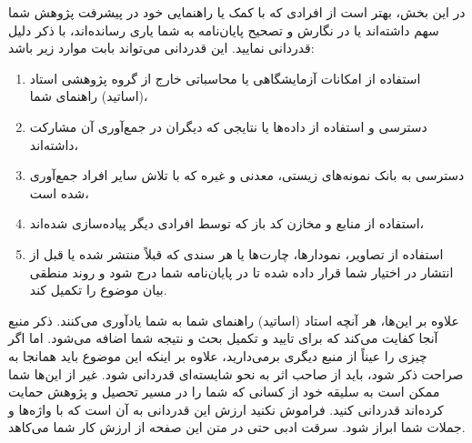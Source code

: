در این بخش، بهتر است از افرادی که با کمک یا راهنمایی خود در پیشرفت پژوهش شما سهم داشته‌اند یا در نگارش و تصحیح پایان‌نامه به شما یاری رسانده‌اند، با ذکر دلیل قدردانی نمایید. این قدردانی می‌تواند بابت موارد زیر باشد:
\begin{enumerate}
\item 
استفاده از امکانات آزمایشگاهی یا محاسباتی خارج از گروه‌ پژوهشی استاد (اساتید) راهنمای شما،
\item
دسترسی و استفاده از داده‌ها یا نتایجی که دیگران در جمع‌آوری آن مشارکت داشته‌اند،
\item 
دسترسی به بانک نمونه‌های زیستی، معدنی و غیره که با تلاش سایر افراد جمع‌آوری شده است،
\item
استفاده از منابع و مخازن کد باز که توسط افرادی دیگر پیاده‌سازی شده‌اند،
\item 
استفاده از تصاویر، نمودارها، چارت‌ها یا هر سندی که قبلاً منتشر شده یا قبل از انتشار در اختیار شما قرار داده شده تا در پایان‌نامه شما درج شود و روند منطقی بیان موضوع را تکمیل کند.
\end{enumerate}
علاوه بر این‌ها، هر آنچه استاد (اساتید) راهنمای شما به شما یادآوری می‌کنند. ذکر منبع آنجا کفایت می‌کند که برای تایید و تکمیل بحث و نتیجه شما اضافه می‌شود. اما اگر چیزی را عیناً از منبع دیگری برمی‌دارید، علاوه بر اینکه این موضوع باید همانجا به صراحت ذکر شود، باید از صاحب اثر به نحو شایسته‌ای قدردانی شود. غیر از این‌ها شما ممکن است به سلیقه خود از کسانی که شما را در مسیر تحصیل و پژوهش حمایت کرده‌اند قدردانی کنید. فراموش نکنید ارزش این قدردانی به آن است که با واژه‌ها و جملات شما ابراز شود. سرقت ادبی حتی در متن این صفحه از ارزش کار شما می‌کاهد.

